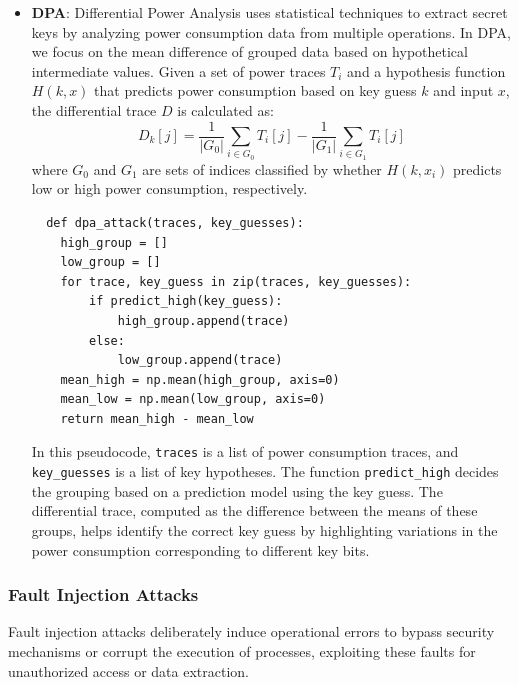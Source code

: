 \begin{itemize}
  \item \textbf{DPA}: Differential Power Analysis uses statistical techniques to extract secret keys by analyzing power consumption data from multiple operations.
  In DPA, we focus on the mean difference of grouped data based on hypothetical intermediate values. Given a set of power traces \( T_i \) and a hypothesis function \( H(k, x) \) that predicts power consumption based on key guess \( k \) and input \( x \), the differential trace \( D \) is calculated as:
\[
D_k[j] = \frac{1}{|G_0|} \sum_{i \in G_0} T_i[j] - \frac{1}{|G_1|} \sum_{i \in G_1} T_i[j]
\]
where \( G_0 \) and \( G_1 \) are sets of indices classified by whether \( H(k, x_i) \) predicts low or high power consumption, respectively.

\begin{verbatim}
  def dpa_attack(traces, key_guesses):
    high_group = []
    low_group = []
    for trace, key_guess in zip(traces, key_guesses):
        if predict_high(key_guess):
            high_group.append(trace)
        else:
            low_group.append(trace)
    mean_high = np.mean(high_group, axis=0)
    mean_low = np.mean(low_group, axis=0)
    return mean_high - mean_low
\end{verbatim}

In this pseudocode, \texttt{traces} is a list of power consumption traces, and \texttt{key\_guesses} is a list of key hypotheses. The function \texttt{predict\_high} decides the grouping based on a prediction model using the key guess. The differential trace, computed as the difference between the means of these groups, helps identify the correct key guess by highlighting variations in the power consumption corresponding to different key bits.

\end{itemize}

\subsubsection{Fault Injection Attacks}

Fault injection attacks deliberately induce operational errors to bypass security mechanisms or corrupt the execution of processes, exploiting these faults for unauthorized access or data extraction.

